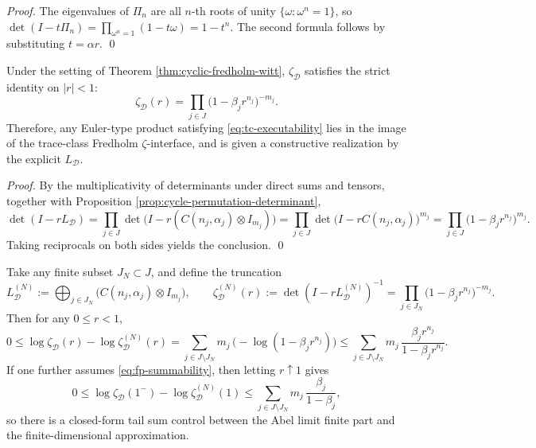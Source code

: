 \begin{proof}
The eigenvalues of \(\Pi_n\) are all \(n\)-th roots of unity \(\{\omega:\omega^n=1\}\), so
\(
\det(I-t\Pi_n)=\prod_{\omega^n=1}(1-t\omega)=1-t^n
\).
The second formula follows by substituting \(t=\alpha r\). \qed
\end{proof}

\begin{corollary}\label{cor:cyclic-euler-product}
Under the setting of Theorem \ref{thm:cyclic-fredholm-witt}, \(\zeta_{\mathcal D}\) satisfies the strict identity on \(|r|<1\):
\[
\zeta_{\mathcal D}(r)
=\prod_{j\in J}\bigl(1-\beta_j r^{n_j}\bigr)^{-m_j}.
\]
Therefore, any Euler-type product satisfying \eqref{eq:tc-executability} lies in the image of the trace-class Fredholm \(\zeta\)-interface, and is given a constructive realization by the explicit \(L_{\mathcal D}\).
\end{corollary}

\begin{proof}
By the multiplicativity of determinants under direct sums and tensors, together with Proposition \ref{prop:cycle-permutation-determinant},
\[
\det(I-rL_{\mathcal D})
=\prod_{j\in J}\det\bigl(I-r(C(n_j,\alpha_j)\otimes I_{m_j})\bigr)
=\prod_{j\in J}\det\bigl(I-rC(n_j,\alpha_j)\bigr)^{m_j}
=\prod_{j\in J}\bigl(1-\beta_j r^{n_j}\bigr)^{m_j}.
\]
Taking reciprocals on both sides yields the conclusion. \qed
\end{proof}

\begin{corollary}\label{cor:cyclic-truncation-bounds}
Take any finite subset \(J_N\subset J\), and define the truncation
\[
L_{\mathcal D}^{(N)}:=\bigoplus_{j\in J_N}\bigl(C(n_j,\alpha_j)\otimes I_{m_j}\bigr),
\qquad
\zeta_{\mathcal D}^{(N)}(r):=\det(I-rL_{\mathcal D}^{(N)})^{-1}
=\prod_{j\in J_N}\bigl(1-\beta_j r^{n_j}\bigr)^{-m_j}.
\]
Then for any \(0\le r<1\),
\[
0\le \log \zeta_{\mathcal D}(r)-\log \zeta_{\mathcal D}^{(N)}(r)
=\sum_{j\in J\setminus J_N} m_j\,\bigl(-\log(1-\beta_j r^{n_j})\bigr)
\le
\sum_{j\in J\setminus J_N} m_j\,\frac{\beta_j r^{n_j}}{1-\beta_j r^{n_j}}.
\]
If one further assumes \eqref{eq:fp-summability}, then letting \(r\uparrow 1\) gives
\[
0\le \log \zeta_{\mathcal D}(1^-)-\log \zeta_{\mathcal D}^{(N)}(1)
\le
\sum_{j\in J\setminus J_N} m_j\,\frac{\beta_j}{1-\beta_j},
\]
so there is a closed-form tail sum control between the Abel limit finite part and the finite-dimensional approximation.
\end{corollary}

